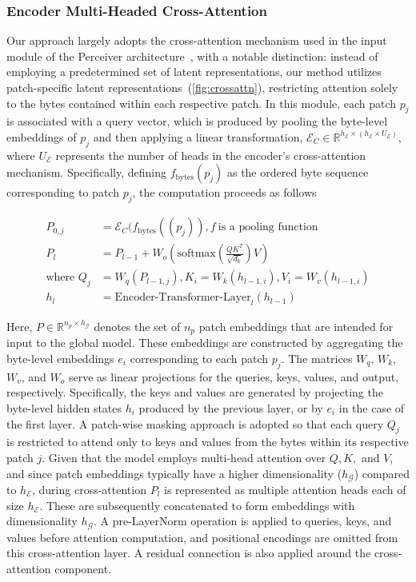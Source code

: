 \subsubsection{Encoder Multi-Headed Cross-Attention}
\label{sec:enc-cross-attn}
Our approach largely adopts the cross-attention mechanism used in the input module of the Perceiver architecture~\citep{jaegle2021perceiver}, with a notable distinction: instead of employing a predetermined set of latent representations, our method utilizes patch-specific latent representations~(\autoref{fig:crossattn}), restricting attention solely to the bytes contained within each respective patch. In this module, each patch $p_j$ is associated with a query vector, which is produced by pooling the byte-level embeddings of $p_j$ and then applying a linear transformation, $\mathcal{E}_{C} \in \mathbb{R}^{h_{\mathcal{E}} \times (h_{\mathcal{E}} \times U_{\mathcal{E}})}$, where $U_{\mathcal{E}}$ represents the number of heads in the encoder’s cross-attention mechanism. Specifically, defining $f_{\text{bytes}}(p_j)$ as the ordered byte sequence corresponding to patch $p_j$, the computation proceeds as follows

\begin{align}
P_{0,j} &= \mathcal{E}_{C}(f_\text{bytes}((p_j)), f~ \text{is a pooling function} \\
P_l &= P_{l-1} + W_o\left(\text{softmax}\left(\frac{QK^T}{\sqrt{d_k}}\right)V\right) \\
\text{where } Q_j &= W_q(P_{l-1,j}), K_i = W_k(h_{l-1,i}), V_i = W_v(h_{l-1,i}) \\
h_l &= \text{Encoder-Transformer-Layer}_l(h_{l-1})
\end{align}

Here, $P \in \mathbb{R}^{n_p \times h_{\mathcal{G}}}$ denotes the set of $n_p$ patch embeddings that are intended for input to the global model. These embeddings are constructed by aggregating the byte-level embeddings $e_i$ corresponding to each patch $p_j$. The matrices $W_q$, $W_k$, $W_v$, and $W_o$ serve as linear projections for the queries, keys, values, and output, respectively. Specifically, the keys and values are generated by projecting the byte-level hidden states $h_i$ produced by the previous layer, or by $e_i$ in the case of the first layer. A patch-wise masking approach is adopted so that each query $Q_j$ is restricted to attend only to keys and values from the bytes within its respective patch $j$. Given that the model employs multi-head attention over $Q, K,$ and $V$, and since patch embeddings typically have a higher dimensionality ($h_{\mathcal{G}}$) compared to $h_{\mathcal{E}}$, during cross-attention $P_l$ is represented as multiple attention heads each of size $h_{\mathcal{E}}$. These are subsequently concatenated to form embeddings with dimensionality $h_{\mathcal{G}}$. A pre-LayerNorm operation is applied to queries, keys, and values before attention computation, and positional encodings are omitted from this cross-attention layer. A residual connection is also applied around the cross-attention component.

